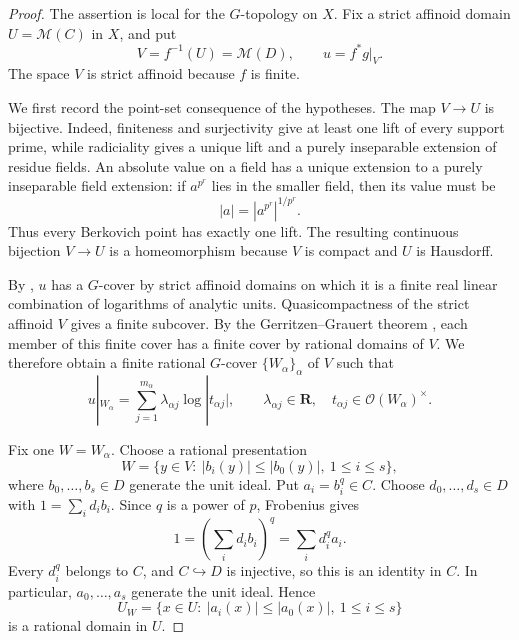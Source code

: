 
\begin{proof}
The assertion is local for the \(G\)-topology on \(X\).  Fix a strict
affinoid domain \(U=\mathcal M(C)\) in \(X\), and put
\[
                V=f^{-1}(U)=\mathcal M(D),\qquad u=f^*g|_V.
\]
The space \(V\) is strict affinoid because \(f\) is finite.

We first record the point-set consequence of the hypotheses.  The map
\(V\to U\) is bijective.  Indeed, finiteness and surjectivity give at least
one lift of every support prime, while radiciality gives a unique lift and a
purely inseparable extension of residue fields.  An absolute value on a
field has a unique extension to a purely inseparable field extension: if
\(a^{p^r}\) lies in the smaller field, then its value must be
\[
                       |a|=|a^{p^r}|^{1/p^r}.
\]
Thus every Berkovich point has exactly one lift.  The resulting continuous
bijection \(V\to U\) is a homeomorphism because \(V\) is compact and \(U\)
is Hausdorff.

By \cite[Definition~5.1 and \S5.2(3),(4)]{GJR26}, \(u\) has a
\(G\)-cover by strict affinoid domains on which it is a finite real linear
combination of logarithms of analytic units.  Quasicompactness of the
strict affinoid \(V\) gives a finite subcover.  By the
Gerritzen--Grauert theorem \cite[Theorem~1.1]{Temkin2005GG}, each member
of this finite cover has a finite cover by rational domains of \(V\).  We
therefore obtain a finite rational \(G\)-cover \(\{W_\alpha\}_\alpha\) of
\(V\) such that
\begin{equation}
 \label{eq:p061-frobenius-upstairs-rpl}
       u|_{W_\alpha}
       =\sum_{j=1}^{m_\alpha}\lambda_{\alpha j}
                      \log|t_{\alpha j}|,
 \qquad
       \lambda_{\alpha j}\in\mathbf R,\quad
       t_{\alpha j}\in\mathcal O(W_\alpha)^\times .
\end{equation}

Fix one \(W=W_\alpha\).  Choose a rational presentation
\[
 W=\bigl\{y\in V:\ |b_i(y)|\leq |b_0(y)|,
                  \ 1\leq i\leq s\bigr\},
\]
where \(b_0,\ldots,b_s\in D\) generate the unit ideal.  Put
\(a_i=b_i^q\in C\).  Choose \(d_0,\ldots,d_s\in D\) with
\(1=\sum_i d_i b_i\).  Since \(q\) is a power of \(p\), Frobenius gives
\[
             1=\left(\sum_i d_i b_i\right)^q
              =\sum_i d_i^q a_i.
\]
Every \(d_i^q\) belongs to \(C\), and \(C\hookrightarrow D\) is injective,
so this is an identity in \(C\).  In particular,
\(a_0,\ldots,a_s\) generate the unit ideal.  Hence
\[
 U_W=\bigl\{x\in U:\ |a_i(x)|\leq |a_0(x)|,
                  \ 1\leq i\leq s\bigr\}
\]
is a rational domain in \(U\).


\end{proof}
